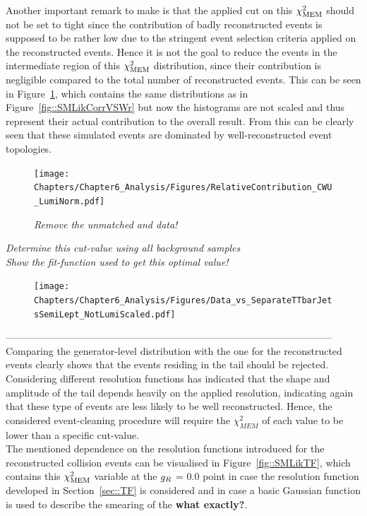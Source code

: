 Another important remark to make is that the applied cut on this $\chi^{2}_{\textrm{MEM}}$ should not be set to tight since the contribution of badly reconstructed events is supposed to be rather low due to the stringent event selection criteria applied on the reconstructed events. Hence it is not the goal to reduce the events in the intermediate region of this $\chi^{2}_{\textrm{MEM}}$ distribution, since their contribution is negligible compared to the total number of reconstructed events. This can be seen in Figure~\ref{fig::SMLikCorrVSWrUnSc}, which contains the same distributions as in Figure~\ref{fig::SMLikCorrVSWr} but now the histograms are not scaled and thus represent their actual contribution to the overall result. From this can be clearly seen that these simulated events are dominated by well-reconstructed event topologies.
\\
\begin{figure}[h!t]
 \centering
 \texttt{[image: Chapters/Chapter6\_Analysis/Figures/RelativeContribution\_CWU\_LumiNorm.pdf]}
 \caption{\textit{Remove the unmatched and data!}} \label{fig::SMLikCorrVSWrUnSc}
\end{figure}


\textit{Determine this cut-value using all background samples}\\
\textit{Show the fit-function used to get this optimal value!}
\begin{figure}[h!t]
 \centering
 \texttt{[image: Chapters/Chapter6\_Analysis/Figures/Data\_vs\_SeparateTTbarJetsSemiLept\_NotLumiScaled.pdf]}
 \caption{} \label{fig::OptCutValue}
\end{figure}


--------------------------------------------------------------------------------------------------- \\
Comparing the generator-level distribution with the one for the reconstructed events clearly shows that the events residing in the tail should be rejected. Considering different resolution functions has indicated that the shape and amplitude of the tail depends heavily on the applied resolution, indicating again that these type of events are less likely to be well reconstructed.
Hence, the considered event-cleaning procedure will require the $\chi^{2}_{MEM}$ of each value to be lower than a specific cut-value. 
\\

The mentioned dependence on the resolution functions introduced for the reconstructed collision events can be visualised in Figure~\ref{fig::SMLikTF}, which contains this $\chi^{2}_{\textrm{MEM}}$ variable at the $g_{R}$ = 0.0 point in case the resolution function developed in Section~\ref{sec::TF} is considered and in case a basic Gaussian function is used to describe the smearing of the \textbf{what exactly?}. 


